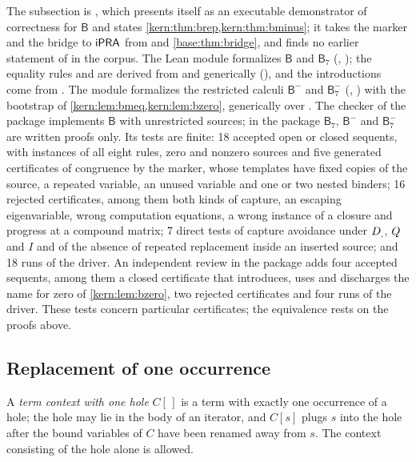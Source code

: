 \begin{remark}[Sources]
\label{kern:rem:brep-sources}
The subsection is , which presents itself as an
executable demonstrator of correctness for $\mathsf{B}$ and states
\cref{kern:thm:brep,kern:thm:bminus}; it takes the marker and the bridge to
$\mathsf{iPRA}$ from  and \cref{base:thm:bridge}, and finds no
earlier statement of  in the corpus.  The Lean module
 formalizes $\mathsf{B}$ and $\mathsf{B}_{7}$
(, ); the equality rules and
 are derived from  and  generically
(), and the introductions come from .  The
module  formalizes the restricted calculi
$\mathsf{B}^{-}$ and $\mathsf{B}^{-}_{7}$ (,
) with the bootstrap of
\cref{kern:lem:bmeq,kern:lem:bzero}, generically over .  The
checker of the package implements $\mathsf{B}$ with unrestricted sources; in
the package $\mathsf{B}_{7}$, $\mathsf{B}^{-}$ and $\mathsf{B}^{-}_{7}$ are
written proofs only.  Its tests are finite: 18
accepted open or closed sequents, with instances of all eight rules, zero
and nonzero sources and five generated certificates of congruence by the
marker, whose templates have fixed copies of the source, a repeated
variable, an unused variable and one or two nested binders; 16 rejected
certificates, among them both kinds of capture, an escaping eigenvariable,
wrong computation equations, a wrong instance of a closure and progress at
a compound matrix; 7 direct tests of capture avoidance under $D_{,}$,
$Q_{}$ and $I$ and of the absence of repeated replacement inside an inserted
source; and 18 runs of the driver.  An independent review in the package
adds four accepted sequents, among them a closed certificate that
introduces, uses and discharges the name for zero of
\cref{kern:lem:bzero}, two rejected certificates and four runs of the
driver.  These tests concern particular certificates; the equivalence rests
on the proofs above.
\end{remark}

\subsection{Replacement of one occurrence}
\label{kern:sec:onehole}

A \emph{term context with one hole} $C[\,]$ is a term with exactly one
occurrence of a hole; the hole may lie in the body of an iterator, and
$C[s]$ plugs $s$ into the hole after the bound variables of $C$ have been
renamed away from $s$.  The context consisting of the hole alone is allowed.

